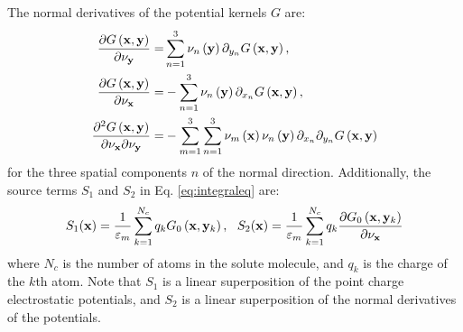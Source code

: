 \documentclass[journal=jpcbfk, manuscript=article]{achemso}
\begin{document}
%
The normal derivatives of the potential kernels $G$ are:
%
\begin{equation}
\begin{split}
\frac{\partial G\left({\bf x}, {\bf y}\right)}{\partial \nu_{\bf y}} =& \sum\limits_{n=1}^{3} \nu_n\left({\bf y}\right)\partial_{y_n}G\left({\bf x}, {\bf y}\right), \\
\frac{\partial G\left({\bf x}, {\bf y}\right)}{\partial \nu_{\bf x}} =& -\sum\limits_{n=1}^{3} \nu_n\left({\bf y}\right)\partial_{x_n}G\left({\bf x}, {\bf y}\right), \\
\frac{\partial^2 G\left({\bf x}, {\bf y}\right)}{\partial \nu_{\bf x}\partial \nu_{\bf y}} =& -\sum\limits_{m=1}^{3}\sum\limits_{n=1}^{3} \nu_m\left({\bf x}\right)\nu_n\left({\bf y}\right)\partial_{x_n}\partial_{y_n}G\left({\bf x}, {\bf y}\right) 
\end{split} \end{equation}
%
for the three spatial components $n$ of the normal direction. Additionally, the source terms $S_1$ and $S_2$ in Eq. \ref{eq:integraleq} are:
%
\begin{equation}
S_1({\bf x}) = \frac{1}{\varepsilon_m}\sum\limits_{k=1}^{N_c}q_k G_0\left({\bf x}, {\bf y}_k\right), \ \ S_2({\bf x}) = \frac{1}{\varepsilon_m}\sum\limits_{k=1}^{N_c}q_k \frac{\partial G_0\left({\bf x}, {\bf y}_k\right)}{\partial \nu_{\bf x}}
\end{equation}
%
where $N_c$ is the number of atoms in the solute molecule, and $q_k$ is the charge of the $k$th atom. Note that $S_1$ is a linear superposition of the point charge electrostatic potentials, and $S_2$ is a linear superposition of the normal derivatives of the potentials.
\end{document}
